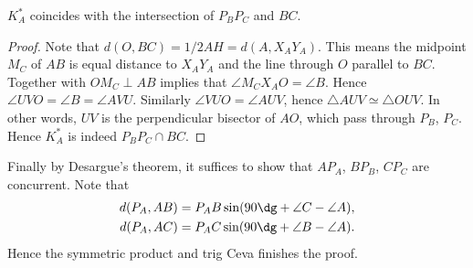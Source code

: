 \documentclass[11pt]{scrartcl}
\begin{document}
\begin{claim*}
  $K_A^\ast$ coincides with the intersection of $P_BP_C$ and $BC$.
\end{claim*}
\begin{proof}
  Note that $d(O, BC) = 1/2 AH = d(A,X_AY_A)$.
  This means the midpoint $M_C$ of $AB$ is equal distance
  to $X_AY_A$ and the line through $O$ parallel to $BC$.
  Together with $OM_C \perp AB$ implies that $\angle M_CX_AO = \angle B$.
  Hence $\angle UVO = \angle B = \angle AVU$.
  Similarly $\angle VUO = \angle AUV$,
  hence $\triangle AUV \simeq \triangle OUV$.
  In other words, $UV$ is the perpendicular bisector of $AO$,
  which pass through $P_B$, $P_C$.
  Hence $K_A^\ast$ is indeed $P_BP_C \cap BC$.
\end{proof}

Finally by Desargue's theorem,
it suffices to show that $AP_A$, $BP_B$, $CP_C$ are concurrent.
Note that
\begin{align*}
  d(P_A, AB) &= P_AB \sin (90\dg + \angle C - \angle A), \\
  d(P_A, AC) &= P_AC \sin (90\dg + \angle B - \angle A).
\end{align*}
Hence the symmetric product and trig Ceva finishes the proof.
\end{document}
